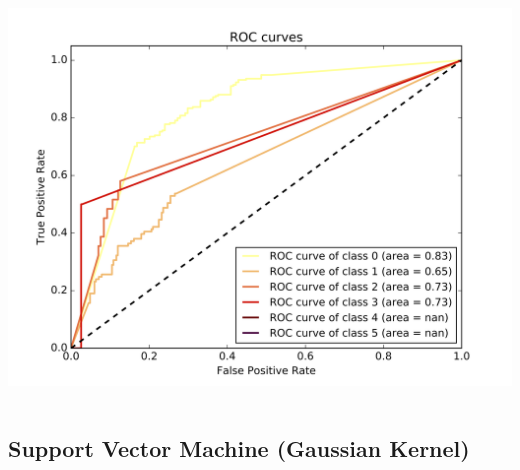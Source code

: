 \documentclass[c]{beamer}
\begin{document}
\begin{frame}
\begin{columns}
\begin{column}{0.6\textwidth}
      \centering\vfill
      \includegraphics[scale=0.18]{../../data/Pays-Bas/test/Nearest_Neighboors_Classification/Nearest_Neighboors_Classification_roc.png}
\end{column}
\end{columns}
\end{frame}



\subsection{Support Vector Machine (Gaussian Kernel)}
\begin{frame}
\tableofcontents[currentsubsection]
\end{frame}
\end{document}

